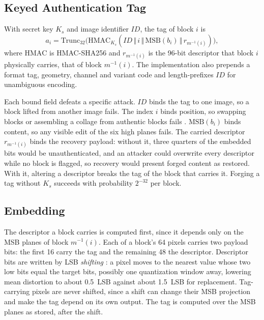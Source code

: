 \subsection{Keyed Authentication Tag}
\label{ssec:tag}
With secret key $K_s$ and image identifier $ID$, the tag of block $i$ is
\begin{equation}
a_i=\mathrm{Trunc}_{32}\!\big(\mathrm{HMAC}_{K_s}(ID\,\Vert\,i\,\Vert\,\mathrm{MSB}(b_i)\,\Vert\,r_{m^{-1}(i)})\big),
\label{eq:tag}
\end{equation}
where $\mathrm{HMAC}$ is HMAC-SHA256 \cite{fips180-4} and $r_{m^{-1}(i)}$ is the 96-bit descriptor that block $i$ physically carries, that of block $m^{-1}(i)$. The implementation also prepends a format tag, geometry, channel and variant code and length-prefixes $ID$ for unambiguous encoding.

Each bound field defeats a specific attack. $ID$ binds the tag to one image, so a block lifted from another image fails. The index $i$ binds position, so swapping blocks or assembling a collage from authentic blocks fails \cite{holliman2000counterfeiting,fridrich2002security}. $\mathrm{MSB}(b_i)$ binds content, so any visible edit of the six high planes fails. The carried descriptor $r_{m^{-1}(i)}$ binds the recovery payload: without it, three quarters of the embedded bits would be unauthenticated, and an attacker could overwrite every descriptor while no block is flagged, so recovery would present forged content as restored. With it, altering a descriptor breaks the tag of the block that carries it. Forging a tag without $K_s$ succeeds with probability $2^{-32}$ per block.

\subsection{Embedding}
\label{ssec:embed}
The descriptor a block carries is computed first, since it depends only on the MSB planes of block $m^{-1}(i)$. Each of a block's 64 pixels carries two payload bits: the first 16 carry the tag and the remaining 48 the descriptor. Descriptor bits are written by LSB \emph{shifting} \cite{ausr1}: a pixel moves to the nearest value whose two low bits equal the target bits, possibly one quantization window away, lowering mean distortion to about 0.5~LSB against about 1.5~LSB for replacement. Tag-carrying pixels are never shifted, since a shift can change their MSB projection and make the tag depend on its own output. The tag is computed over the MSB planes as stored, after the shift.


